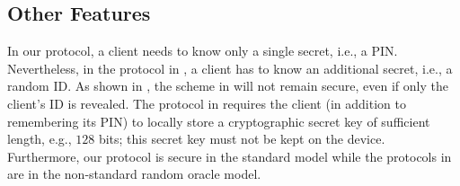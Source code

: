 \subsection{Other Features}

 In our protocol, a client needs to know only a single secret, i.e., a  PIN. Nevertheless, in the protocol in \cite{WangW18}, a client has to know an additional secret, i.e., a random ID. As shown in \cite{Scott12a}, the scheme in \cite{WangW18} will not remain secure, even if only the client's ID is revealed. The protocol in \cite{JareckiJKSS21} requires the client (in addition to remembering its PIN) to locally store a cryptographic secret key of sufficient length, e.g., $128$ bits; this secret key must not be kept on the device. 
 Furthermore, our protocol is secure in the standard model while the protocols in \cite{WangW18,JareckiJKSS21} are in the non-standard random oracle model. 

